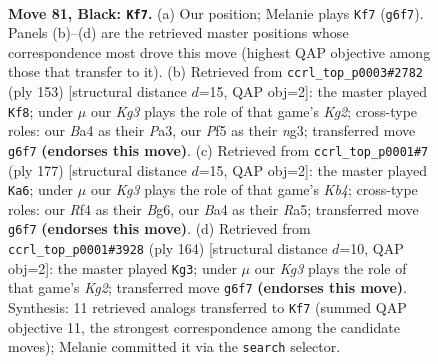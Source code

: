 \documentclass[11pt]{article}
\begin{document}
\clearpage

\begin{figure}[p]\centering
\begin{subfigure}{0.46\textwidth}\centering
\resizebox{\linewidth}{!}{%
\newchessgame
\chessboard[
  setfen={7R/8/P5k1/5p2/b4r2/8/8/7K b - - 1 81},
  showmover=false,
  pgfstyle=straightmove, color=movearrow, markmove={g6-f7}
]}
\caption{}
\end{subfigure}\hfill
\begin{subfigure}{0.46\textwidth}\centering
\resizebox{\linewidth}{!}{%
\newchessgame
\chessboard[
  setfen={8/6k1/8/1R4K1/8/p5N1/8/r7 b - - 4 77},
  showmover=false,
  pgfstyle=straightmove, color=movearrow, markmove={g7-f8}
]}
\caption{}
\end{subfigure}
\\[4pt]
\begin{subfigure}{0.46\textwidth}\centering
\resizebox{\linewidth}{!}{%
\newchessgame
\chessboard[
  setfen={8/5p2/6b1/rk6/8/4N3/8/2R1K3 b - - 1 89},
  showmover=false,
  pgfstyle=straightmove, color=movearrow, markmove={b5-a6}
]}
\caption{}
\end{subfigure}\hfill
\begin{subfigure}{0.46\textwidth}\centering
\resizebox{\linewidth}{!}{%
\newchessgame
\chessboard[
  setfen={5R2/6r1/8/6k1/4p3/8/5PK1/8 w - - 3 83},
  showmover=false,
  pgfstyle=straightmove, color=movearrow, markmove={g2-g3}
]}
\caption{}
\end{subfigure}
\caption{\textbf{Move 81, Black: \texttt{Kf7}.} (a) Our position; Melanie plays \texttt{Kf7} (\texttt{g6f7}). Panels (b)--(d) are the retrieved master positions whose correspondence most drove this move (highest QAP objective among those that transfer to it). (b) Retrieved from \texttt{ccrl\_top\_p0003\#2782} (ply 153) [structural distance $d$=15, QAP obj=2]: the master played \texttt{Kf8}; under $\mu$ our \emph{Kg3} plays the role of that game's \emph{Kg2}; cross-type roles: our \emph{B}a4 as their \emph{P}a3, our \emph{P}f5 as their \emph{n}g3; transferred move \texttt{g6f7} \textbf{(endorses this move)}. (c) Retrieved from \texttt{ccrl\_top\_p0001\#7} (ply 177) [structural distance $d$=15, QAP obj=2]: the master played \texttt{Ka6}; under $\mu$ our \emph{Kg3} plays the role of that game's \emph{Kb4}; cross-type roles: our \emph{R}f4 as their \emph{B}g6, our \emph{B}a4 as their \emph{R}a5; transferred move \texttt{g6f7} \textbf{(endorses this move)}. (d) Retrieved from \texttt{ccrl\_top\_p0001\#3928} (ply 164) [structural distance $d$=10, QAP obj=2]: the master played \texttt{Kg3}; under $\mu$ our \emph{Kg3} plays the role of that game's \emph{Kg2}; transferred move \texttt{g6f7} \textbf{(endorses this move)}. Synthesis: 11 retrieved analogs transferred to \texttt{Kf7} (summed QAP objective 11, the strongest correspondence among the candidate moves); Melanie committed it via the \texttt{search} selector.}
\label{fig:thought-m161}
\end{figure}
\end{document}
